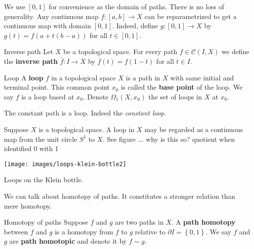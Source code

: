 \begin{remark}
    We use \([0,1]\) for   convenience as the domain of paths. There is no loss of generality. Any continuous map \(f\colon  [a,b]\to X\) can be reparametrized to get a continuous map with domain \([0,1]\).  Indeed, define \(g\colon  [0,1]\to X\) by \(g(t) = f(a+t(b-a))\) for all \(t\in [0,1]\).
\end{remark}

\begin{definition}{Inverse path}{}
    Let \(X\) be a topological space.
    For every path \(f\in \mathcal{C}(I,X)\) we define the \textbf{inverse path} \(\bar{f} \colon I\to X\) by \(\bar{f}(t)=f(1-t)\) for all \(t\in I\).
\end{definition}

\begin{definition}{Loop}{}
    A \textbf{loop} \(f\) in a topological space \(X\) is a path in \(X\) with same initial and terminal point. This common  point \(x_0\) is called the \textbf{base point} of the loop. We say \(f\) is a loop based at \(x_0\). Denote \(\Omega_1(X,x_0)\) the set of loops in \(X\) at \(x_0\). 
\end{definition}



\begin{example} The constant path is a loop. Indeed the \textit{constant loop}.
    
    Suppose \(X\) is a topological space. A loop in \(X\) may be regarded as a continuous map from the unit circle \(S^1\) to \(X\). See figure ... 
            why is this so? quotient when identified 0 with 1


    \begin{marginfigure}
        \captionsetup{type=figure}
        \texttt{[image: images/loops-klein-bottle2]}
        \vspace*{\baselineskip}
        \caption{Loops on the Klein bottle.}
    \end{marginfigure}
            
\end{example}

We can talk about homotopy of paths. It constitutes  a stronger relation than mere homotopy.

\begin{definition}{Homotopy of paths}{}
    Suppose \(f\) and \(g\) are two paths in \(X\). A \textbf{path homotopy} between \(f\) and \(g\) is a homotopy from \(f\) to \(g\) relative to \(\partial I = \left\{ 0, 1\right\}\). 
    We say  \(f\) and \(g\) are \textbf{path homotopic} and denote it by \(f\sim g\).
\end{definition}

